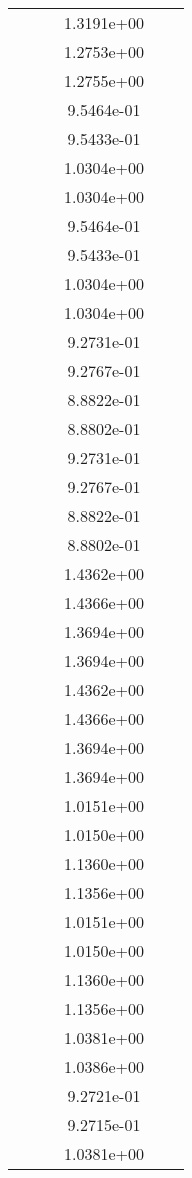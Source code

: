 \begin{xltabular}{\textwidth}{r|rS[table-format=1.3e+2]S[table-format=1.4e+2]S[table-format=1.4e+2]S[table-format=-1.5]}
&  &  & 1.3191e+00 & & \\
&  &  & 1.2753e+00 & & \\
&  &  & 1.2755e+00 & & \\
&  &  & 9.5464e-01 & & \\
&  &  & 9.5433e-01 & & \\
&  &  & 1.0304e+00 & & \\
&  &  & 1.0304e+00 & & \\
&  &  & 9.5464e-01 & & \\
&  &  & 9.5433e-01 & & \\
&  &  & 1.0304e+00 & & \\
&  &  & 1.0304e+00 & & \\
&  &  & 9.2731e-01 & & \\
&  &  & 9.2767e-01 & & \\
&  &  & 8.8822e-01 & & \\
&  &  & 8.8802e-01 & & \\
&  &  & 9.2731e-01 & & \\
&  &  & 9.2767e-01 & & \\
&  &  & 8.8822e-01 & & \\
&  &  & 8.8802e-01 & & \\
&  &  & 1.4362e+00 & & \\
&  &  & 1.4366e+00 & & \\
&  &  & 1.3694e+00 & & \\
&  &  & 1.3694e+00 & & \\
&  &  & 1.4362e+00 & & \\
&  &  & 1.4366e+00 & & \\
&  &  & 1.3694e+00 & & \\
&  &  & 1.3694e+00 & & \\
&  &  & 1.0151e+00 & & \\
&  &  & 1.0150e+00 & & \\
&  &  & 1.1360e+00 & & \\
&  &  & 1.1356e+00 & & \\
&  &  & 1.0151e+00 & & \\
&  &  & 1.0150e+00 & & \\
&  &  & 1.1360e+00 & & \\
&  &  & 1.1356e+00 & & \\
&  &  & 1.0381e+00 & & \\
&  &  & 1.0386e+00 & & \\
&  &  & 9.2721e-01 & & \\
&  &  & 9.2715e-01 & & \\
&  &  & 1.0381e+00 & & \\

\end{xltabular}
